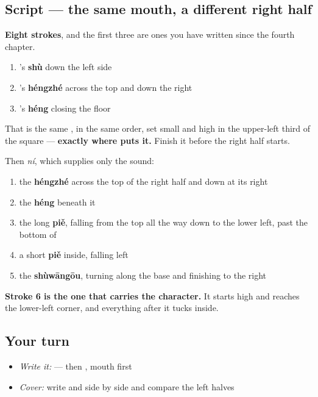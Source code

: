 \subsection*{Script — the same mouth, a different right half}

\begin{quote}
\end{quote}

\textbf{Eight strokes}, and the first three are ones you have written since the fourth chapter.

\begin{enumerate}
\raggedright
  \item {}'s \textbf{shù} down the left side
  \item {}'s \textbf{héngzhé} across the top and down the right
  \item {}'s \textbf{héng} closing the floor
\end{enumerate}

That is the same , in the same order, set small and high in the upper-left third of the square — \textbf{exactly where  puts it.} Finish it before the right half starts.

Then  \emph{ní}, which supplies only the sound:

\begin{enumerate}
\raggedright
  \item the \textbf{héngzhé} across the top of the right half and down at its right
  \item the \textbf{héng} beneath it
  \item the long \textbf{piě}, falling from the top all the way down to the lower left, past the bottom of 
  \item a short \textbf{piě} inside, falling left
  \item the \textbf{shùwāngōu}, turning along the base and finishing to the right
\end{enumerate}

\textbf{Stroke 6 is the one that carries the character.} It starts high and reaches the lower-left corner, and everything after it tucks inside.

\subsection*{Your turn}
\begin{itemize}
\raggedright
  \item \emph{Write it:}  — then , mouth first
  \item \emph{Cover:} write  and  side by side and compare the left halves
\end{itemize}

